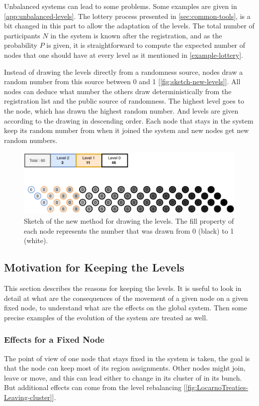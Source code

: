\documentclass[a4paper,11pt,oneside]{report}
\begin{document}
Unbalanced systems can lead to some problems. Some examples are given in
\autoref{app:unbalanced-levels}. The lottery process presented in
\autoref{sec:common-tools}, is a bit changed in this part to allow the
adaptation of the levels. The total number of participants $N$ in the system is
known after the registration, and as the probability $P$ is given, it is
straightforward to compute the expected number of nodes that one should have at
every level as it mentioned in \autoref{example-lottery}. 

Instead of drawing the levels directly from a randomness source, nodes 
draw a random number from this source between 0 and 1
[\autoref{fig:sketch-new-levels}]. All nodes can deduce what number the others
draw deterministically from the registration list and the public source of
randomness. The highest level goes to the node, which has drawn the highest
random number. And levels are given according to the drawing in descending
order. Each node that stays in the system keep its random number from when
it joined the system and new nodes get new random numbers. 

\begin{figure}[!h] 
\centering
\includegraphics[width=400pt]{figures/Lottery-Locarno}
\caption{Sketch of the new method for drawing the levels. The fill property of each node represents
 the number that was drawn from 0 (black) to 1 (white).}
 \label{fig:sketch-new-levels}
\end{figure}


\subsection{Motivation for Keeping the Levels} This section describes the
reasons for keeping the levels. It is useful to look in detail at what are the consequences of
the movement of a given node on a given fixed node, to understand what are the effects on the
global system. Then some precise examples
of the evolution of the system are treated as well. 

\subsubsection{Effects for a Fixed Node} The point of view of one node that
stays fixed in the system is taken, the goal is that the node can keep most of
its region assignments. Other nodes might join, leave or move, and this can lead
either to change in its cluster of in its bunch. But additional effects can
come from the level rebalancing
[\autoref{fig:LocarnoTreaties-Leaving-cluster}]. 
\end{document}
